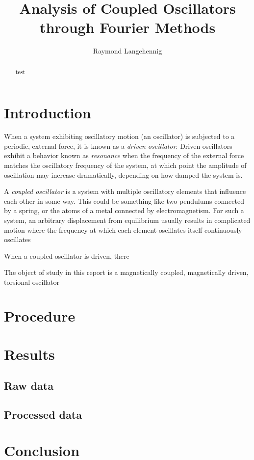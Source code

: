 \documentclass{article}
\title{Analysis of Coupled Oscillators through Fourier Methods}
\author{Raymond Langehennig}
\begin{document}
\maketitle

\begin{abstract}
    test
\end{abstract}

\section{Introduction}
When a system exhibiting oscillatory motion (an oscillator) is subjected to a periodic, external force, it is known as a \emph{driven oscillator}. Driven oscillators exhibit a behavior known as \emph{resonance} when the frequency of the external force matches the oscillatory frequency of the system, at which point the amplitude of oscillation may increase dramatically, depending on how damped the system is.

A \emph{coupled oscillator} is a system with multiple oscillatory elements that influence each other in some way. This could be something like two pendulums connected by a spring, or the atoms of a metal connected by electromagnetism. For such a system, an arbitrary displacement from equilibrium usually results in complicated motion where the frequency at which each element oscillates itself continuously oscillates

When a coupled oscillator is driven, there 

The object of study in this report is a magnetically coupled, magnetically driven, torsional oscillator

\section{Procedure}

\section{Results}
\subsection{Raw data}
\subsection{Processed data}

\section{Conclusion}
\end{document}
